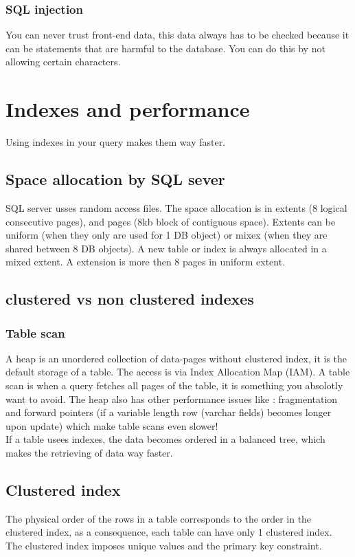 \documentclass{report}
\begin{document}
	\subsection{SQL injection}
	You can never trust front-end data, this data always has to be checked because it can be statements that are harmful to the database. You can do this by not allowing certain characters. 
	\chapter{Indexes and performance}
	Using indexes in your query makes them way faster. 
	\section{Space allocation by SQL sever}
	SQL server usses random access files. The space allocation is in extents (8 logical consecutive pages), and pages (8kb block of contiguous space). Extents can be uniform (when they only are used for 1 DB object) or mixex (when they are shared between 8 DB objects). A new table or index is always allocated in a mixed extent. A extension is more then 8 pages in uniform extent. 
	\section{clustered vs non clustered indexes}
	\subsection{Table scan}
	A heap is an unordered collection of data-pages without clustered index, it is the default storage of a table. The access is via Index Allocation Map (IAM). A table scan is when a query fetches all pages of the table, it is something you absolotly want to avoid. The heap also has other performance issues like : fragmentation and forward pointers (if a variable length row (varchar fields) becomes longer upon update) which make table scans even slower!
	\\
	If a table usees indexes, the data becomes ordered in a balanced tree, which makes the retrieving of data way faster. 
	\section{Clustered index}
	The physical order of the rows in a table corresponds to the order in the clustered index, as a consequence, each table can have only 1 clustered index. The clustered index imposes unique values and the primary key constraint.
\end{document}
